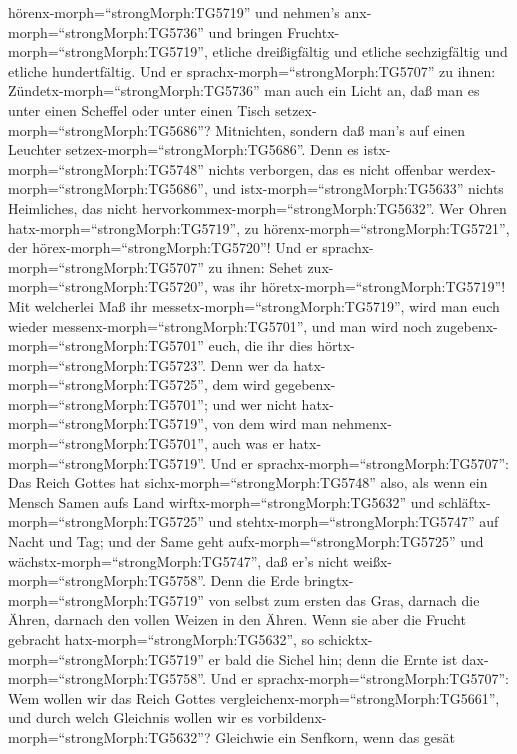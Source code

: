 hörenx-morph=``strongMorph:TG5719'' und nehmen's
anx-morph=``strongMorph:TG5736'' und bringen
Fruchtx-morph=``strongMorph:TG5719'', etliche dreißigfältig und etliche
sechzigfältig und etliche hundertfältig.  Und er
sprachx-morph=``strongMorph:TG5707'' zu ihnen:
Zündetx-morph=``strongMorph:TG5736'' man auch ein Licht an, daß man es
unter einen Scheffel oder unter einen Tisch
setzex-morph=``strongMorph:TG5686''? Mitnichten, sondern daß man's auf
einen Leuchter setzex-morph=``strongMorph:TG5686''.  Denn
es istx-morph=``strongMorph:TG5748'' nichts verborgen, das es nicht
offenbar werdex-morph=``strongMorph:TG5686'', und
istx-morph=``strongMorph:TG5633'' nichts Heimliches, das nicht
hervorkommex-morph=``strongMorph:TG5632''.  Wer Ohren
hatx-morph=``strongMorph:TG5719'', zu
hörenx-morph=``strongMorph:TG5721'', der
hörex-morph=``strongMorph:TG5720''!  Und er
sprachx-morph=``strongMorph:TG5707'' zu ihnen: Sehet
zux-morph=``strongMorph:TG5720'', was ihr
höretx-morph=``strongMorph:TG5719''! Mit welcherlei Maß ihr
messetx-morph=``strongMorph:TG5719'', wird man euch wieder
messenx-morph=``strongMorph:TG5701'', und man wird noch
zugebenx-morph=``strongMorph:TG5701'' euch, die ihr dies
hörtx-morph=``strongMorph:TG5723''.  Denn wer da
hatx-morph=``strongMorph:TG5725'', dem wird
gegebenx-morph=``strongMorph:TG5701''; und wer nicht
hatx-morph=``strongMorph:TG5719'', von dem wird man
nehmenx-morph=``strongMorph:TG5701'', auch was er
hatx-morph=``strongMorph:TG5719''.  Und er
sprachx-morph=``strongMorph:TG5707'': Das Reich Gottes hat
sichx-morph=``strongMorph:TG5748'' also, als wenn ein Mensch Samen aufs
Land wirftx-morph=``strongMorph:TG5632''  und
schläftx-morph=``strongMorph:TG5725'' und
stehtx-morph=``strongMorph:TG5747'' auf Nacht und Tag; und der Same geht
aufx-morph=``strongMorph:TG5725'' und
wächstx-morph=``strongMorph:TG5747'', daß er's nicht
weißx-morph=``strongMorph:TG5758''.  Denn die Erde
bringtx-morph=``strongMorph:TG5719'' von selbst zum ersten das Gras,
darnach die Ähren, darnach den vollen Weizen in den Ähren. 
Wenn sie aber die Frucht gebracht hatx-morph=``strongMorph:TG5632'', so
schicktx-morph=``strongMorph:TG5719'' er bald die Sichel hin; denn die
Ernte ist dax-morph=``strongMorph:TG5758''.  Und er
sprachx-morph=``strongMorph:TG5707'': Wem wollen wir das Reich Gottes
vergleichenx-morph=``strongMorph:TG5661'', und durch welch Gleichnis
wollen wir es vorbildenx-morph=``strongMorph:TG5632''? 
Gleichwie ein Senfkorn, wenn das gesät
